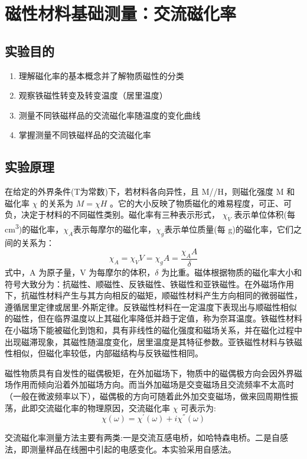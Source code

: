 \chapter{磁性材料基础测量：交流磁化率}
\section{实验目的}
    \begin{enumerate}
        \item 理解磁化率的基本概念并了解物质磁性的分类 
        \item 观察铁磁性转变及转变温度（居里温度）
        \item 测量不同铁磁样品的交流磁化率随温度的变化曲线
        \item 掌握测量不同铁磁样品的交流磁化率
    \end{enumerate}
\section{实验原理}
    在给定的外界条件(T为常数)下，若材料各向异性，且 M//H，则磁化强度 M 和磁化率 $\chi$ 的关系为 $M=\chi H$ 。它的大小反映了物质磁化的难易程度，可正、可负，决定于材料的不同磁性类别。磁化率有三种表示形式， $\chi_V$ 表示单位体积(每 \unit{\cm^3})的磁化率，$\chi_A$表示每摩尔的磁化率，$\chi_g$表示单位质量(每 g)的磁化率，它们之间的关系为：
    \begin{equation}
        \chi_{A}=\chi_{V}V=\chi_{g}A=\frac{\chi_{A}A}{\delta}
    \end{equation}
    式中，A 为原子量，V 为每摩尔的体积，$\delta$ 为比重。磁体根据物质的磁化率大小和符号大致分为：抗磁性、顺磁性、反铁磁性、铁磁性和亚铁磁性。在外磁场作用下，抗磁性材料产生与其方向相反的磁矩，顺磁性材料产生方向相同的微弱磁性，遵循居里定律或居里-外斯定律。反铁磁性材料在一定温度下表现出与顺磁性相似的磁性，但在临界温度以上其磁化率降低并趋于定值，称为奈耳温度。铁磁性材料在小磁场下能被磁化到饱和，具有非线性的磁化强度和磁场关系，并在磁化过程中出现磁滞现象，其磁性随温度变化，居里温度是其特征参数。亚铁磁性材料与铁磁性相似，但磁化率较低，内部磁结构与反铁磁性相同。\par
    磁性物质具有自发性的磁偶极矩，在外加磁场下，物质中的磁偶极方向会因外界磁场作用而倾向沿着外加磁场方向。而当外加磁场是交变磁场且交流频率不太高时（一般在微波频率以下），磁偶极的方向可随着此外加交变磁场，做来回周期性振荡，此即交流磁化率的物理原因，交流磁化率 $\chi$ 可表示为:
    \begin{equation}
        \chi(\omega)=\chi^{'}(\omega)+i\chi^{''}(\omega)
    \end{equation}\par
    交流磁化率测量方法主要有两类:一是交流互感电桥，如哈特森电桥。二是自感法，即测量样品在线圈中引起的电感变化。本实验采用自感法。
